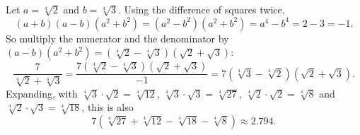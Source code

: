 Let $a=\sqrt[4]2$ and $b=\sqrt[4]3$. Using the difference of squares twice,
\[(a+b)(a-b)(a^2+b^2)=(a^2-b^2)(a^2+b^2)=a^4-b^4=2-3=-1 .\]
So multiply the numerator and the denominator by $(a-b)(a^2+b^2)=\left(\sqrt[4]2-\sqrt[4]3\right)\left(\sqrt2+\sqrt3\right)$:
\[\dfrac{7}{\sqrt[4]2+\sqrt[4]3}=\dfrac{7\left(\sqrt[4]2-\sqrt[4]3\right)\left(\sqrt2+\sqrt3\right)}{-1}=\boxed{7\left(\sqrt[4]3-\sqrt[4]2\right)\left(\sqrt2+\sqrt3\right)} .\]
Expanding, with $\sqrt[4]3\cdot\sqrt2=\sqrt[4]{12}$, $\sqrt[4]3\cdot\sqrt3=\sqrt[4]{27}$, $\sqrt[4]2\cdot\sqrt2=\sqrt[4]8$ and $\sqrt[4]2\cdot\sqrt3=\sqrt[4]{18}$, this is also
\[7\left(\sqrt[4]{27}+\sqrt[4]{12}-\sqrt[4]{18}-\sqrt[4]{8}\right)\approx 2.794 .\]
